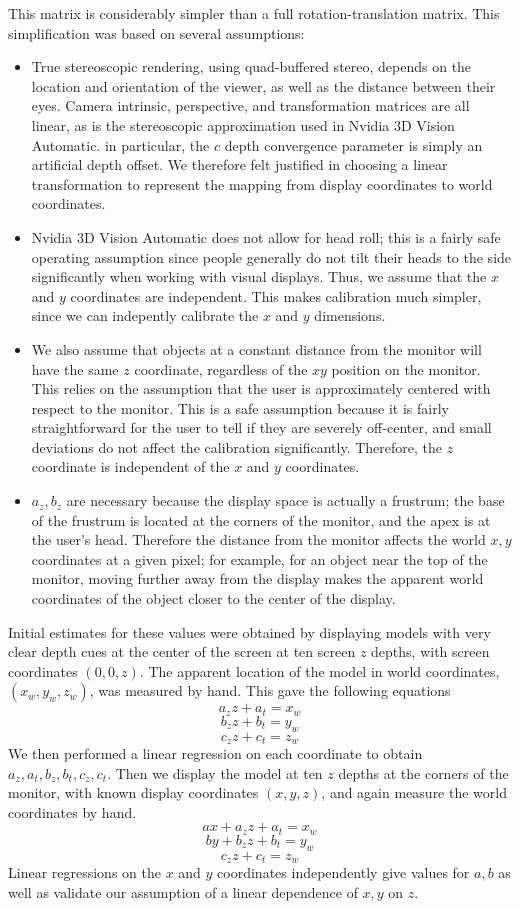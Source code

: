 \documentclass[pageno]{jpaper}
\begin{document}
This matrix is considerably simpler than a full rotation-translation matrix. This simplification was based on several assumptions:
\begin{itemize}
\item True stereoscopic rendering, using quad-buffered stereo, depends on the location and orientation of the viewer, as well as the distance between
their eyes.
Camera intrinsic, perspective, and transformation matrices are all linear, as is the stereoscopic approximation used in Nvidia 3D Vision
Automatic. in particular, the $c$ depth convergence parameter is simply an artificial depth offset. We therefore felt justified in choosing
a linear transformation to represent the mapping from display coordinates to world coordinates.
\item Nvidia 3D Vision Automatic does not allow for head roll; this is a fairly safe operating assumption since people generally do
not tilt their heads to the side significantly when working with visual displays. Thus, we assume that the $x$ and $y$ coordinates are
independent. This makes calibration much simpler, since we can indepently calibrate the $x$ and $y$ dimensions.
\item We also assume that objects at a constant distance from the monitor will have the same $z$ coordinate, regardless
of the $xy$ position on the monitor. This relies on the assumption that the user is approximately centered with respect to the monitor. This is
a safe assumption because it is fairly straightforward for the user to tell if they are severely off-center, and small deviations
do not affect the calibration significantly. Therefore, the $z$ coordinate is independent of the $x$ and $y$ coordinates.
\item $a_z, b_z$ are necessary because the display space is actually a frustrum; the base of the frustrum is located at the corners of
the monitor, and the apex is at the user's head. Therefore the distance from the monitor affects the world $x,y$ coordinates at a given
pixel; for example, for an object near the top of the monitor, moving further away from the display makes the apparent world coordinates of the
object closer to the center of the display.
\end{itemize}

Initial estimates for these values were obtained by displaying models with very clear depth cues at the center of the screen at ten screen $z$ depths,
with screen coordinates $(0,0,z)$. The apparent location of the model in world coordinates, $(x_w, y_w, z_w)$, was measured by hand. This gave the following equations
$$a_zz + a_t = x_w$$
$$b_zz + b_t = y_w$$
$$c_zz + c_t = z_w$$
We then performed a linear regression on each coordinate to obtain $a_z, a_t, b_z, b_t, c_z, c_t$.
Then we display the model at ten $z$ depths at the corners of the monitor, with known display coordinates $(x, y, z)$, and again measure the world coordinates
by hand.
$$ax + a_zz + a_t = x_w$$
$$by + b_zz + b_t = y_w$$
$$c_zz + c_t = z_w$$
Linear regressions on the $x$ and $y$ coordinates independently give values for $a,b$ as well as validate our assumption of a linear dependence of $x,y$ on $z$.
\end{document}
